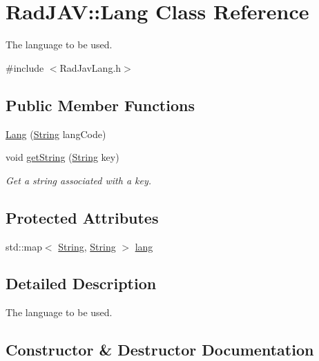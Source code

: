 \hypertarget{class_rad_j_a_v_1_1_lang}{}\section{Rad\+J\+AV\+:\+:Lang Class Reference}
\label{class_rad_j_a_v_1_1_lang}


The language to be used.  




{\ttfamily \#include $<$Rad\+Jav\+Lang.\+h$>$}

\subsection*{Public Member Functions}
\begin{DoxyCompactItemize}
\item 
\mbox{\hyperlink{class_rad_j_a_v_1_1_lang_a6ed1ecee6842cf5d4ffa0a5afcc8dbbc}{Lang}} (\mbox{\hyperlink{class_rad_j_a_v_1_1_string}{String}} lang\+Code)
\item 
void \mbox{\hyperlink{class_rad_j_a_v_1_1_lang_a38ebc57271ef3ffc4ed6aec7854360bf}{get\+String}} (\mbox{\hyperlink{class_rad_j_a_v_1_1_string}{String}} key)
\begin{DoxyCompactList}\small\item\em Get a string associated with a key. \end{DoxyCompactList}\end{DoxyCompactItemize}
\subsection*{Protected Attributes}
\begin{DoxyCompactItemize}
\item 
std\+::map$<$ \mbox{\hyperlink{class_rad_j_a_v_1_1_string}{String}}, \mbox{\hyperlink{class_rad_j_a_v_1_1_string}{String}} $>$ \mbox{\hyperlink{class_rad_j_a_v_1_1_lang_ae8341308089ef735fd294bbdd91c2f37}{lang}}
\end{DoxyCompactItemize}


\subsection{Detailed Description}
The language to be used. 

\subsection{Constructor \& Destructor Documentation}
\mbox{\label{class_rad_j_a_v_1_1_lang_a6ed1ecee6842cf5d4ffa0a5afcc8dbbc}} 
